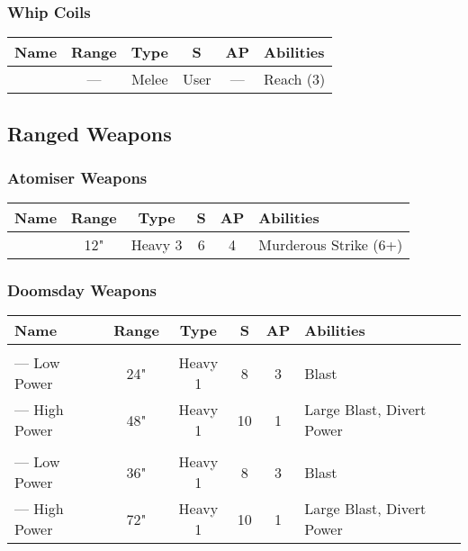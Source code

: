 \subsubsection{Whip Coils}
\label{Whip Coils}
\noindent
\begin{NiceTabular}{m{130 pt} *{4}{c} >{\raggedright\arraybackslash}p{240pt}}
	Name & Range & Type & S & AP & Abilities \\
	\hline
	 & — & Melee & User & — & Reach (3) \\
\end{NiceTabular}



\subsection{Ranged Weapons} \label{Ranged Weapons}


\subsubsection{Atomiser Weapons}

\label{Atomiser Beam Lance}
\noindent
\begin{NiceTabular}{m{130 pt} *{4}{c} >{\raggedright\arraybackslash}p{240pt}}
	Name & Range & Type & S & AP & Abilities \\
	\hline
	 & 12" & Heavy 3 & 6 & 4 & Murderous Strike (6+) \\
\end{NiceTabular}

\subsubsection{Doomsday Weapons} 
\label{Doomsday Cannon} \label{Doomsday Blaster}
\noindent
\begin{NiceTabular}{m{130 pt} *{4}{c} >{\raggedright\arraybackslash}p{240pt}}
	Name & Range & Type & S & AP & Abilities \\
	\hline
	 & & & & & \\
	— Low Power & 24" & Heavy 1 & 8 & 3 & Blast \\
	— High Power & 48" & Heavy 1 & 10 & 1 & Large Blast, Divert Power \\
	  & & & & & \\
	 — Low Power & 36" & Heavy 1 & 8 & 3 & Blast \\
	 — High Power & 72" & Heavy 1 & 10 & 1 & Large Blast, Divert Power \\
\end{NiceTabular}

